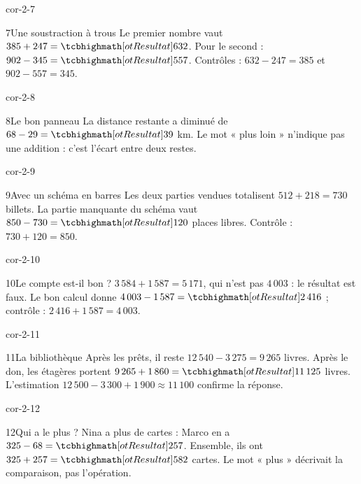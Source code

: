 \begin{blocLivre}{cor-2-7}\begin{corrige}{7}{Une soustraction à trous}
Le premier nombre vaut $385+247=\res{632}$. Pour le second : $902-345=\res{557}$. Contrôles : $632-247=385$ et $902-557=345$.
\end{corrige}\end{blocLivre}
\begin{blocLivre}{cor-2-8}\begin{corrige}{8}{Le bon panneau}
La distance restante a diminué de $68-29=\res{39}$ km. Le mot « plus loin » n’indique pas une addition : c’est l’écart entre deux restes.
\end{corrige}\end{blocLivre}
\begin{blocLivre}{cor-2-9}\begin{corrige}{9}{Avec un schéma en barres}
Les deux parties vendues totalisent $512+218=730$ billets. La partie manquante du schéma vaut $850-730=\res{120}$ places libres. Contrôle : $730+120=850$.
\label{fig-cor-2-9}
\end{corrige}\end{blocLivre}
\begin{blocLivre}{cor-2-10}\begin{corrige}{10}{Le compte est-il bon ?}
$3\,584+1\,587=5\,171$, qui n’est pas $4\,003$ : le résultat est faux. Le bon calcul donne $4\,003-1\,587=\res{2\,416}$ ; contrôle : $2\,416+1\,587=4\,003$.
\end{corrige}\end{blocLivre}
\begin{blocLivre}{cor-2-11}\begin{corrige}{11}{La bibliothèque}
Après les prêts, il reste $12\,540-3\,275=9\,265$ livres. Après le don, les étagères portent $9\,265+1\,860=\res{11\,125}$ livres. L’estimation $12\,500-3\,300+1\,900\approx11\,100$ confirme la réponse.
\end{corrige}\end{blocLivre}
\begin{blocLivre}{cor-2-12}\begin{corrige}{12}{Qui a le plus ?}
Nina a plus de cartes : Marco en a $325-68=\res{257}$. Ensemble, ils ont $325+257=\res{582}$ cartes. Le mot « plus » décrivait la comparaison, pas l’opération.
\label{fig-cor-2-12}
\end{corrige}\end{blocLivre}
